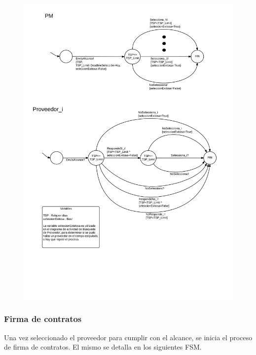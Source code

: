 \begin{figure}[H]
\includegraphics[width=\linewidth]{diag/nuevos/fsm-selprov.png}
\end{figure}

		\subsubsection{Firma de contratos}
Una vez seleccionado el proveedor para cumplir con el alcance, se inicia 
el proceso de firma de contratos. El mismo se detalla en los siguientes FSM. 

